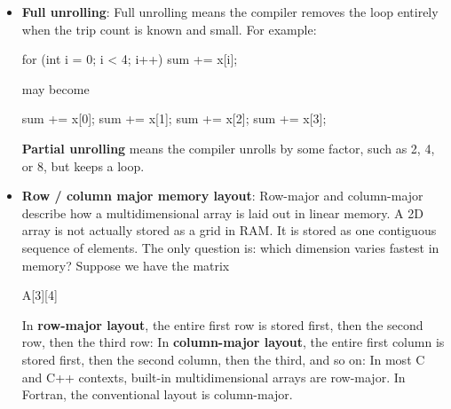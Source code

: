 \documentclass{report}
\begin{document}
\begin{itemize}
\begin{cppcode}
                    for (; i + 3 < n; i += 4) {
                        body(i);
                        body(i + 1);
                        body(i + 2);
                        body(i + 3);
                    }
                    for (; i < n; i++) {
                        body(i);
                    }
                \end{cppcode}
                \bigbreak \noindent 
                The second loop handles the leftover iterations. This is often called the remainder loop or epilogue loop.
            \item \textbf{Full unrolling}: Full unrolling means the compiler removes the loop entirely when the trip count is known and small. For example:
                \bigbreak \noindent 
                \begin{cppcode}
                    for (int i = 0; i < 4; i++) {
                        sum += x[i];
                    }
                \end{cppcode}
                \bigbreak \noindent 
                may become
                \bigbreak \noindent 
                \begin{cppcode}
                sum += x[0];
                sum += x[1];
                sum += x[2];
                sum += x[3];
                \end{cppcode}
                \bigbreak \noindent 
                \textbf{Partial unrolling} means the compiler unrolls by some factor, such as 2, 4, or 8, but keeps a loop.
            \item \textbf{Row / column major memory layout}: Row-major and column-major describe how a multidimensional array is laid out in linear memory.
                \bigbreak \noindent 
                A 2D array is not actually stored as a grid in RAM. It is stored as one contiguous sequence of elements. The only question is: which dimension varies fastest in memory? Suppose we have the matrix
                \bigbreak \noindent 
                \begin{cppcode}
                    A[3][4]
                \end{cppcode}
                \bigbreak \noindent 
                In \textbf{row-major layout}, the entire first row is stored first, then the second row, then the third row:
                \bigbreak \noindent 
                In \textbf{column-major layout}, the entire first column is stored first, then the second column, then the third, and so on:
                \bigbreak \noindent 
                In most C and C++ contexts, built-in multidimensional arrays are row-major. In Fortran, the conventional layout is column-major.

\end{itemize}
\end{document}
